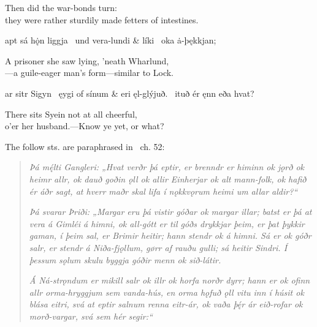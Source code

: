 \bvb Then did  the war-bonds turn: \\
they were rather sturdily made fetters of intestines.\evb
\evg


\bvg
\bva[34a]apt sá hǫ̇n liggja \hld\ und vera-lundi &
 líki \hld\ oka ȧ-þękkjan;\eva

\bvb A prisoner she saw lying, ’neath Wharlund, \\
—a guile-eager man’s form—similar to Lock.\evb
\evg


\bvg
\bva[34b]ar sitr Sigyn \hld\ ęygi of sínum &
eri ęl-glýjuð. \hld\ ituð ér ęnn eða hvat?\eva

\bvb There sits Syein not at all cheerful, \\
o’er her husband.—Know ye yet, or what?\evb
\evg{}

\sectionline

The follow sts. are paraphrased in \Gylfaginning\ ch. 52:

\begin{quote}
	\emph{Þá mę́lti Gangleri: „Hvat verðr þá eptir, er brenndr er himinn ok jǫrð ok heimr allr, ok dauð goðin ǫll ok allir Einherjar ok alt mann-folk, ok hafið ér áðr sagt, at hverr maðr skal lifa í nǫkkvǫrum heimi um allar aldir?“}

	\emph{Þá svarar Þriði: „Margar eru þá vistir góðar ok margar illar; batst er þá at vera á Gimléi á himni, ok all-gótt er til góðs drykkjar þeim, er þat þykkir gaman, í þeim sal, er Brimir heitir; hann stendr ok á himni. Sá er ok góðr salr, er stendr á Niða-fjǫllum, gørr af rauðu gulli; sá heitir Sindri. Í þessum sǫlum skulu byggja góðir menn ok sið-látir.}

	\emph{Á Ná-strǫndum er mikill salr ok illr ok horfa norðr dyrr; hann er ok ofinn allr orma-hryggjum sem vanda-hús, en orma hǫfuð ǫll vitu inn í húsit ok blása eitri, svá at eptir salnum renna eitr-ár, ok vaða þę́r ár eið-rofar ok morð-vargar, svá sem hér segir:“}
\end{quote}

